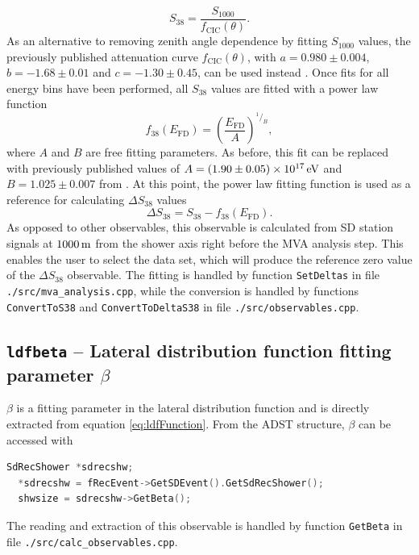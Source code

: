 \documentclass[12pt,a4paper]{report}
\newcommand*\rfrac[2]{{}^{#1}\!/_{#2}}	%
\begin{document}
\begin{equation}\label{eq:s1000tos38}
S_{38} = \frac{S_{1000}}{f_{\textrm{CIC}}(\theta)}.
\end{equation}
As an alternative to removing zenith angle dependence by fitting $S_{1000}$ values, the previously published attenuation curve $f_{\textrm{CIC}}(\theta)$, with $a = 0.980\pm 0.004$, $b = -1.68\pm 0.01$ and $c = -1.30\pm 0.45$, can be used instead \cite{fcicICRC2013}. Once fits for all energy bins have been performed, all $S_{38}$ values are fitted with a power law function
\begin{equation}\label{eq:powerlawfit}
f_{38}(E_{\textrm{FD}}) = \left(\frac{E_{\textrm{FD}}}{A}\right)^{\rfrac{1}{B}},
\end{equation}
where $A$ and $B$ are free fitting parameters. As before, this fit can be replaced with previously published values of $A = \unit[(1.90\pm 0.05)\times 10^{17}]{eV}$ and $B = 1.025\pm 0.007$ from \cite{fcicICRC2013}. At this point, the power law fitting function is used as a reference for calculating $\Delta S_{38}$ values
\begin{equation}
\Delta S_{38} = S_{38} - f_{38}(E_{\textrm{FD}}).
\end{equation}
As opposed to other observables, this observable is calculated from SD station signals at $\unit[1000]{m}$ from the shower axis right before the MVA analysis step. This enables the user to select the data set, which will produce the reference zero value of the $\Delta S_{38}$ observable. The fitting is handled by function \texttt{SetDeltas} in file \texttt{./src/mva\_analysis.cpp}, while the conversion is handled by functions \texttt{ConvertToS38} and \texttt{ConvertToDeltaS38} in file \texttt{./src/observables.cpp}.

\subsection{\texttt{ldfbeta} -- Lateral distribution function fitting parameter $\beta$}
$\beta$ is a fitting parameter in the lateral distribution function and is directly extracted from equation \eqref{eq:ldfFunction}. From the ADST structure, $\beta$ can be accessed with
\begin{lstlisting}[language=C++]
  SdRecShower *sdrecshw;
  *sdrecshw = fRecEvent->GetSDEvent().GetSdRecShower();
  shwsize = sdrecshw->GetBeta();
\end{lstlisting}
The reading and extraction of this observable is handled by function \texttt{GetBeta} in file \texttt{./src/calc\_observables.cpp}.
\end{document}
